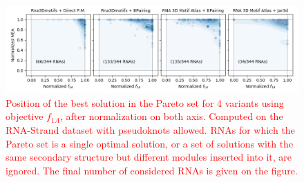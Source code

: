 \documentclass{bioinfo}
\begin{document}
\begin{figure}[!tbp]
  \includegraphics[width=\linewidth]{kernels_A.jpg}
  \caption{\textcolor{red}{Position of the best solution in the Pareto set for 4 variants using objective $f_{1A}$, after normalization on both axis. Computed on the RNA-Strand dataset with pseudoknots allowed. RNAs for which the Pareto set is a single optimal solution, or a set of solutions with the same secondary structure but different modules inserted into it, are ignored. The final number of considered RNAs is given on the figure.}}
  \label{fig:pareto}
\end{figure}
\end{document}
